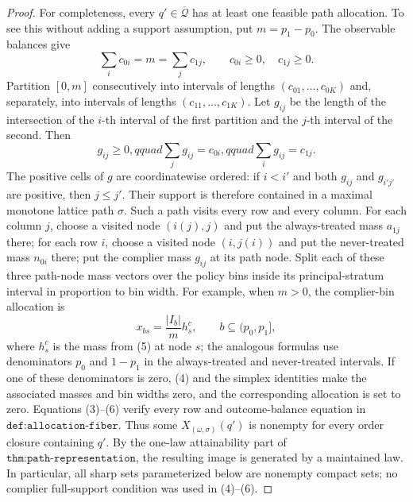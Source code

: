 \documentclass{article}
\begin{document}
\begin{proof}
For completeness, every \(q'\in\overline{\mathcal Q}\) has at least one feasible path allocation.  To see this without adding a support assumption, put \(m=p_1-p_0\).  The observable balances give
\[
 \sum_i c_{0i}=m=\sum_j c_{1j},\qquad c_{0i}\geq0,\quad c_{1j}\geq0.
 \tag{4}
\]
Partition \([0,m]\) consecutively into intervals of lengths \((c_{01},\ldots,c_{0K})\) and, separately, into intervals of lengths \((c_{11},\ldots,c_{1K})\).  Let \(g_{ij}\) be the length of the intersection of the \(i\)-th interval of the first partition and the \(j\)-th interval of the second.  Then
\[
 g_{ij}\geq0,qquad \sum_jg_{ij}=c_{0i},qquad \sum_ig_{ij}=c_{1j}.
 \tag{5}
\]
The positive cells of \(g\) are coordinatewise ordered: if \(i<i'\) and both \(g_{ij}\) and \(g_{i'j'}\) are positive, then \(j\leq j'\).  Their support is therefore contained in a maximal monotone lattice path \(\sigma\).  Such a path visits every row and every column.  For each column \(j\), choose a visited node \((i(j),j)\) and put the always-treated mass \(a_{1j}\) there; for each row \(i\), choose a visited node \((i,j(i))\) and put the never-treated mass \(n_{0i}\) there; put the complier mass \(g_{ij}\) at its path node.  Split each of these three path-node mass vectors over the policy bins inside its principal-stratum interval in proportion to bin width.  For example, when \(m>0\), the complier-bin allocation is
\[
 x_{bs}=\frac{|I_b|}{m}h^{c}_s,
 \qquad b\subseteq(p_0,p_1],
 \tag{6}
\]
where \(h^c_s\) is the mass from (5) at node \(s\); the analogous formulas use denominators \(p_0\) and \(1-p_1\) in the always-treated and never-treated intervals.  If one of these denominators is zero, (4) and the simplex identities make the associated masses and bin widths zero, and the corresponding allocation is set to zero.  Equations (3)--(6) verify every row and outcome-balance equation in \(\texttt{def:allocation-fiber}\).  Thus some \(X_{(\omega,\sigma)}(q')\) is nonempty for every order closure containing \(q'\).  By the one-law attainability part of \(\texttt{thm:path-representation}\), the resulting image is generated by a maintained law.  In particular, all sharp sets parameterized below are nonempty compact sets; no complier full-support condition was used in (4)--(6).


\end{proof}
\end{document}
